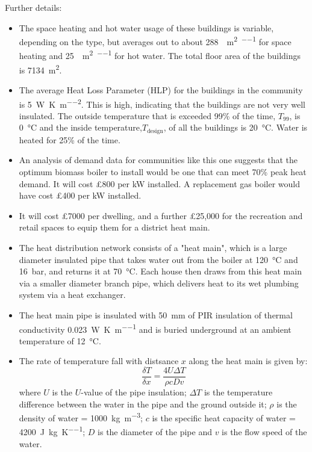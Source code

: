 \documentclass[parskip=half]{scrartcl}
\begin{document}
Further details:
\begin{itemize}
\item The space heating and hot water usage of these buildings is variable, depending on the type, but averages out to about \SI{288}{\kWhr\per\metre\squared\per\year} for space heating and \SI{25}{\kWhr\per\metre\squared\per\year} for hot water. The total floor area of the buildings is \SI{7134}{\metre\squared}.

\item The average Heat Loss Parameter (HLP) for the buildings in the community is \SI{5}{\watt\per\kelvin\per\metre\squared}. This is high, indicating that the buildings are not very well insulated. The outside temperature that is exceeded 99\% of the time, $T_{99}$, is \SI{0}{\celsius} and the inside temperature,$T_\text{design}$, of all the buildings is \SI{20}{\celsius}. Water is heated for 25\% of the time.

\item An analysis of demand data for communities like this one suggests that the optimum biomass boiler to install would be one that can meet 70\% peak heat demand. It will cost £800 per kW installed. A replacement gas boiler would have cost £400 per kW installed.

\item It will cost £7000 per dwelling, and a further £25,000 for the recreation and retail spaces to equip them for a district heat main.

\item The heat distribution network consists of a "heat main", which is a large diameter insulated pipe that takes water out from the boiler at \SI{120}{\celsius} and \SI{16}{\bar}, and returns it at \SI{70}{\celsius}. Each house then draws from this heat main via a smaller diameter branch pipe, which delivers heat to its wet plumbing system via a heat exchanger.

\item The heat main pipe is insulated with \SI{50}{\milli\metre} of PIR insulation of thermal conductivity \SI{0.023}{\watt\per\kelvin\per\metre} and is buried underground at an ambient temperature of \SI{12}{\celsius}.

\item The rate of temperature fall with distsance $x$ along the heat main is given by:
\begin{equation}
\label{eq:tfall}
\frac{\delta T}{\delta x}=\frac{4U\Delta T}{\rho c D v}
\end{equation}
where $U$ is the $U$-value of the pipe insulation; $\Delta T$ is the temperature difference between the water in the pipe and the ground outside it; $\rho$ is the density of water = \SI{1000}{\kg\per\metre\cubed}; $c$ is the specific heat capacity of water = \SI{4200}{\joule\per\kg\per\kelvin}; $D$ is the diameter of the pipe and $v$ is the flow speed of the water.


\end{itemize}
\end{document}
